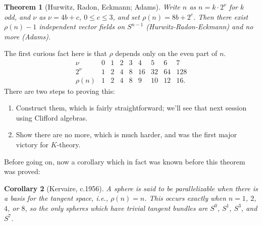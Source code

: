 \documentclass{article}
\newtheorem{thm}{Theorem}[section]
\newtheorem{cor}[thm]{Corollary}
\theoremstyle{definition}
\begin{document}
\begin{thm}[Hurwitz, Radon, Eckmann; Adams]
Write $n$ as $n = k \cdot 2^\nu$ for $k$ odd, and $\nu$ as $\nu = 4b + c$, $0 \le c \le 3$, and set $\rho(n) = 8b + 2^c$.  Then there exist $\rho(n) - 1$ independent vector fields on $S^{n-1}$ (Hurwitz-Radon-Eckmann) and no more (Adams).
\end{thm}
The first curious fact here is that $\rho$ depends only on the even part of $n$.
\[\begin{array}{c|cccccccc}
\nu & 0 & 1 & 2 & 3 & 4 & 5 & 6 & 7 \\
2^\nu & 1 & 2 & 4 & 8 & 16 & 32 & 64 & 128 \\
\hline
\rho(n) & 1 & 2 & 4 & 8 & 9 & 10 & 12 & 16.
\end{array}\]
There are two steps to proving this:
\begin{enumerate} %
\item Construct them, which is fairly straightforward; we'll see that next session using Clifford algebras.
\item Show there are no more, which is much harder, and was the first major victory for $K$-theory.
\end{enumerate}
Before going on, now a corollary which in fact was known before this theorem was proved:
\begin{cor}[Kervaire, c.1956]
A sphere is said to be parallelizable when there is a basis for the tangent space, i.e., $\rho(n) = n$.  This occurs exactly when $n = 1$, $2$, $4$, or $8$, so the only spheres which have trivial tangent bundles are $S^0$, $S^1$, $S^3$, and $S^7$.
\end{cor}
\end{document}

